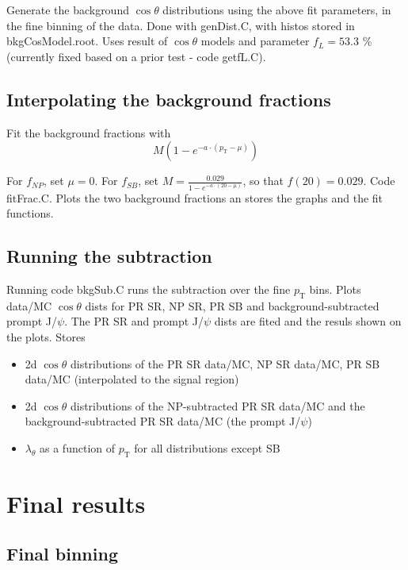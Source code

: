 \documentclass{article}
\newcommand{\pt}{p_\text{T}}
\newcommand{\cost}{\cos\theta}
\begin{document}
Generate the background $\cost$ distributions using the above fit parameters, in the fine binning of the data. Done with genDist.C, with histos stored in bkgCosModel.root. Uses result of $\cost$ models and parameter $f_L = 53.3$ \% (currently fixed based on a prior test - code getfL.C).

\subsection{Interpolating the background fractions}

Fit the background fractions with 
\begin{equation}
M\left(1-e^{-a\cdot(\pt-\mu)}\right)
\end{equation}

For $f_{NP}$, set $\mu=0$. For $f_{SB}$, set $M = \frac{0.029}{1-e^{-a\cdot(20-\mu)}}$, so that $f(20) = 0.029$. Code fitFrac.C. Plots the two background fractions an stores the graphs and the fit functions.

\subsection{Running the subtraction}

Running code bkgSub.C runs the subtraction over the fine $\pt$ bins. Plots data/MC $\cost$ dists for PR SR, NP SR, PR SB and background-subtracted prompt J/$\psi$. The PR SR and prompt J/$\psi$ dists are fited and the resuls shown on the plots. Stores
\begin{itemize}
\item 2d $\cost$ distributions of the PR SR data/MC, NP SR data/MC, PR SB data/MC (interpolated to the signal region)
\item 2d $\cost$ distributions of the NP-subtracted PR SR data/MC and the background-subtracted PR SR data/MC (the prompt J/$\psi$)
\item $\lambda_\theta$ as a function of $\pt$ for all distributions except SB
\end{itemize}

\pagebreak

\section{Final results}

\subsection{Final binning}
\end{document}
